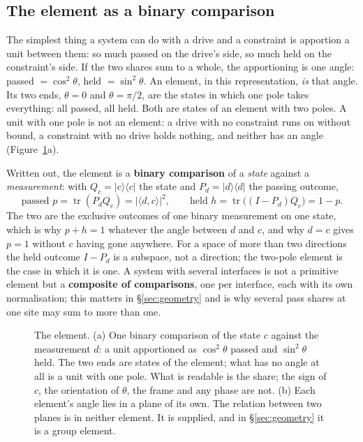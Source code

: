 \documentclass[11pt,a4paper]{article}
\theoremstyle{plain}
\theoremstyle{definition}
\theoremstyle{remark}
\newcommand{\tr}{\operatorname{tr}}
\begin{document}
\subsection{The element as a binary comparison}\label{sec:comparison}

The simplest thing a system can do with a drive and a constraint is apportion a unit between them: so much passed on the drive's side, so much held on the constraint's side. If the two shares sum to a whole, the apportioning is one angle: passed $=\cos^2\theta$, held $=\sin^2\theta$. An element, in this representation, \emph{is} that angle. Its two ends, $\theta=0$ and $\theta=\pi/2$, are the states in which one pole takes everything: all passed, all held. Both are states of an element with two poles. A unit with one pole is not an element: a drive with no constraint runs on without bound, a constraint with no drive holds nothing, and neither has an angle (Figure~\ref{fig:element}a).

Written out, the element is a \textbf{binary comparison} of a \emph{state} against a \emph{measurement}: with $Q_c=|c\rangle\langle c|$ the state and $P_d=|d\rangle\langle d|$ the passing outcome,
\begin{equation}
\text{passed } p=\tr(P_dQ_c)=|\langle d,c\rangle|^2,\qquad \text{held } h=\tr\big((I-P_d)Q_c\big)=1-p.
\end{equation}
The two are the exclusive outcomes of one binary measurement on one state, which is why $p+h=1$ whatever the angle between $d$ and $c$, and why $d=c$ gives $p=1$ without $c$ having gone anywhere. For a space of more than two directions the held outcome $I-P_d$ is a subspace, not a direction; the two-pole element is the case in which it is one. A system with several interfaces is not a primitive element but a \textbf{composite of comparisons}, one per interface, each with its own normalisation; this matters in \S\ref{sec:geometry} and is why several pass shares at one site may sum to more than one.

\begin{figure}[!htbp]
\centering

\caption{The element. (a) One binary comparison of the state $c$ against the measurement $d$: a unit apportioned as $\cos^2\theta$ passed and $\sin^2\theta$ held. The two ends are states of the element; what has no angle at all is a unit with one pole. What is readable is the share; the sign of $c$, the orientation of $\theta$, the frame and any phase are not. (b) Each element's angle lies in a plane of its own. The relation between two planes is in neither element. It is supplied, and in \S\ref{sec:geometry} it is a group element.}
\label{fig:element}
\end{figure}
\end{document}
